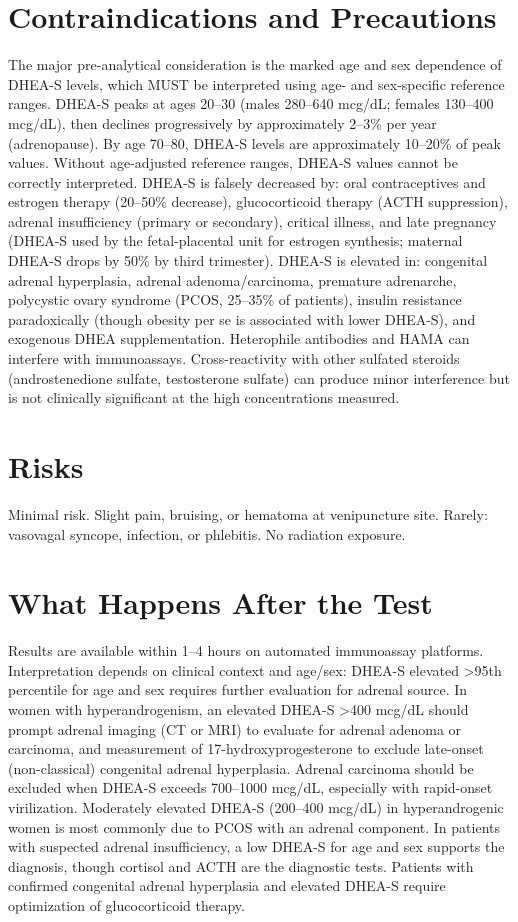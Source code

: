 \section*{Contraindications and Precautions}
The major pre-analytical consideration is the marked age and sex dependence of DHEA-S levels, which MUST be interpreted using age- and sex-specific reference ranges. DHEA-S peaks at ages 20--30 (males 280--640 mcg/dL; females 130--400 mcg/dL), then declines progressively by approximately 2--3\% per year (adrenopause). By age 70--80, DHEA-S levels are approximately 10--20\% of peak values. Without age-adjusted reference ranges, DHEA-S values cannot be correctly interpreted. DHEA-S is falsely decreased by: oral contraceptives and estrogen therapy (20--50\% decrease), glucocorticoid therapy (ACTH suppression), adrenal insufficiency (primary or secondary), critical illness, and late pregnancy (DHEA-S used by the fetal-placental unit for estrogen synthesis; maternal DHEA-S drops by 50\% by third trimester). DHEA-S is elevated in: congenital adrenal hyperplasia, adrenal adenoma/carcinoma, premature adrenarche, polycystic ovary syndrome (PCOS, 25--35\% of patients), insulin resistance paradoxically (though obesity per se is associated with lower DHEA-S), and exogenous DHEA supplementation. Heterophile antibodies and HAMA can interfere with immunoassays. Cross-reactivity with other sulfated steroids (androstenedione sulfate, testosterone sulfate) can produce minor interference but is not clinically significant at the high concentrations measured.

\section*{Risks}
Minimal risk. Slight pain, bruising, or hematoma at venipuncture site. Rarely: vasovagal syncope, infection, or phlebitis. No radiation exposure.

\section*{What Happens After the Test}
Results are available within 1--4 hours on automated immunoassay platforms. Interpretation depends on clinical context and age/sex: DHEA-S elevated >95th percentile for age and sex requires further evaluation for adrenal source. In women with hyperandrogenism, an elevated DHEA-S >400 mcg/dL should prompt adrenal imaging (CT or MRI) to evaluate for adrenal adenoma or carcinoma, and measurement of 17-hydroxyprogesterone to exclude late-onset (non-classical) congenital adrenal hyperplasia. Adrenal carcinoma should be excluded when DHEA-S exceeds 700--1000 mcg/dL, especially with rapid-onset virilization. Moderately elevated DHEA-S (200--400 mcg/dL) in hyperandrogenic women is most commonly due to PCOS with an adrenal component. In patients with suspected adrenal insufficiency, a low DHEA-S for age and sex supports the diagnosis, though cortisol and ACTH are the diagnostic tests. Patients with confirmed congenital adrenal hyperplasia and elevated DHEA-S require optimization of glucocorticoid therapy.

